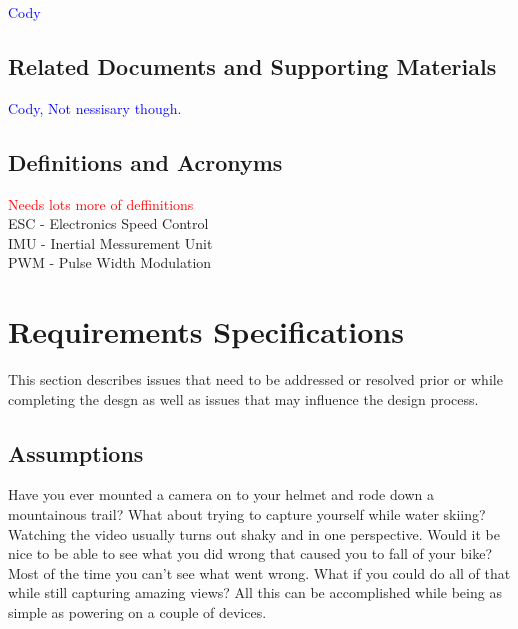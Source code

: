 \documentclass{article}
\numberwithin{equation}{section} %
\begin{document}
\textcolor{blue}{Cody}

\subsection{Related Documents and Supporting Materials}

\textcolor{blue}{Cody, Not nessisary though.} 

\subsection{Definitions and Acronyms}
\textcolor{red}{Needs lots more of deffinitions}\\
ESC - Electronics Speed Control\\
IMU - Inertial Messurement Unit\\
PWM - Pulse Width Modulation

\section{Requirements Specifications}
This section describes issues that need to be addressed or resolved prior or while completing the desgn as well as issues that may influence the design process.

\subsection{Assumptions}
Have you ever mounted a camera on to your helmet and rode down a mountainous trail? What about trying to capture yourself while water skiing? Watching the video usually turns out shaky and in one perspective. Would it be nice to be able to see what you did wrong that caused you to fall of your bike? Most of the time you can't see what went wrong. What if you could do all of that while still capturing amazing views?  All this can be accomplished while being as simple as powering on a couple of devices. 
\end{document}
